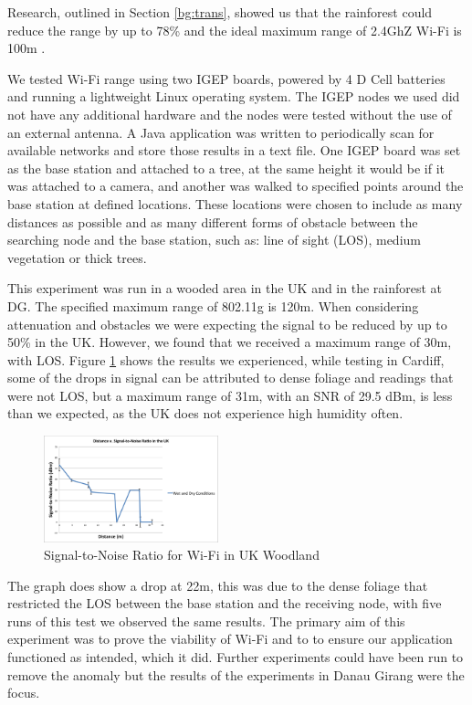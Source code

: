 Research, outlined in Section \ref{bg:trans}, showed us that the rainforest could reduce the range by up to 78\% and the ideal maximum range of 2.4GhZ Wi-Fi is 100m \cite{Dhawan2007}. 

We tested Wi-Fi range using two IGEP boards, powered by 4 D Cell batteries and running a lightweight Linux operating system.	The IGEP nodes we used did not have any additional hardware and the nodes were tested without the use of an external antenna. A Java application was written to periodically scan for available networks and store those results in a text file. One IGEP board was set as the base station and attached to a tree, at the same height it would be if it was attached to a camera, and another was walked to specified points around the base station at defined locations. These locations were chosen to include as many distances as possible and as many different forms of obstacle between the searching node and the base station, such as: line of sight (LOS), medium vegetation or thick trees.
			
This experiment was run in a wooded area in the UK and in the rainforest at DG. The specified maximum range of 802.11g is 120m. When considering attenuation and obstacles we were expecting the signal to be reduced by up to 50\% in the UK. However, we found that we received a maximum range of 30m, with LOS. Figure \ref{cardiffsnr} shows the results we experienced, while testing in Cardiff, some of the drops in signal can be attributed to dense foliage and readings that were not LOS, but a maximum range of 31m, with an SNR of 29.5 dBm, is less than we expected, as the UK does not experience high humidity often.
			
			\begin{figure}[!t]
			\centering
			\includegraphics[width=0.45\textwidth]{Chap3/figures/bp_snr.png}
			\caption{Signal-to-Noise Ratio for Wi-Fi in UK Woodland}
			\label{cardiffsnr}
			\end{figure}
			
	The graph does show a drop at 22m, this was due to the dense foliage that restricted the LOS between the base station and the receiving node, with five runs of this test we observed the same results. The primary aim of this experiment was to prove the viability of Wi-Fi and to to ensure our application functioned as intended, which it did. Further experiments could have been run to remove the anomaly but the results of the experiments in Danau Girang were the focus.
		 
